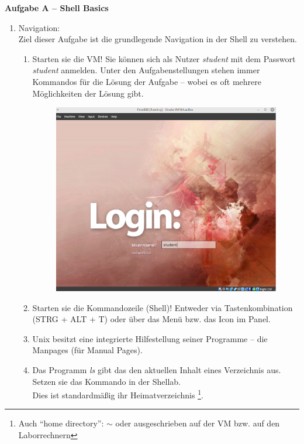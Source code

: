 \documentclass[paper=a4,fontsize=11pt]{scrartcl}%
\numberwithin{equation}{section}
\begin{document}
\begin{center}\Large{\textbf{Aufgabe A -- Shell Basics}}\end{center}\vskip0.25in
\begin{enumerate}
\item Navigation:\\
Ziel dieser Aufgabe ist die grundlegende Navigation in der Shell zu verstehen.
\begin{enumerate}[label=(\alph*)]
		\item Starten sie die VM! Sie können sich als Nutzer \emph{student} mit dem Passwort \emph{student} anmelden. Unter den Aufgabenstellungen stehen immer Kommandos für die Lösung der Aufgabe -- wobei es oft mehrere Möglichkeiten der Lösung gibt.
		\begin{figure}[H]
		\centering
		\includegraphics[scale=0.3]{freebsd_login}
		\end{figure}
		\item Starten sie die Kommandozeile (Shell)! Entweder via Tastenkombination  (STRG + ALT + T) oder über das Menü bzw. das Icon im Panel.
		\item Unix besitzt eine integrierte Hilfestellung seiner Programme -- die Manpages (für Manual Pages).
		\item Das Programm \emph{ls} gibt das den aktuellen Inhalt eines Verzeichnis aus. Setzen sie das Kommando in der Shellab.\\
		Dies ist standardmäßig ihr Heimatverzeichnis \footnote{Auch \enquote{home directory}: $\sim$ oder ausgeschrieben  auf der VM bzw.  auf den Laborrechnern}.

\end{enumerate}
\end{enumerate}
\end{document}
